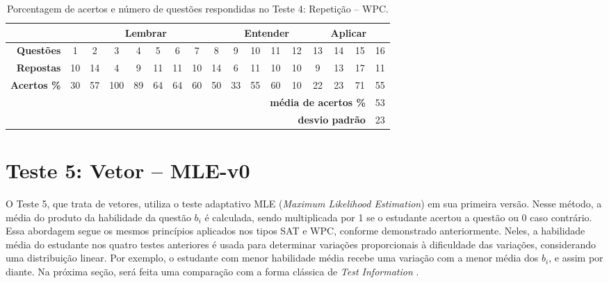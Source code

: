 \begin{table}[!ht]
    \centering
    \caption{Porcentagem de acertos e número de questões respondidas no Teste 4: Repetição -- WPC.}
    \label{tab:respostas_atualizada_teste4}
    \begin{tabular}{|r|*{16}{c|}}
        \hline
        \multicolumn{1}{|l|}{} & \multicolumn{8}{c|}{\cellcolor{green!25}\textbf{Lembrar}} & \multicolumn{4}{c|}{\cellcolor{yellow!25}\textbf{Entender}} & \multicolumn{4}{c|}{\cellcolor{red!25}\textbf{Aplicar}} \\\hline
        \rowcolor[HTML]{D9D9D9} 
        \textbf{Questões}    & 1  & 2 & 3 & 4 & 5 & 6 & 7 & 8 & 9 & 10 & 11 & 12 & 13 & 14 & 15 & 16 \\
        \textbf{Repostas}   & 10 & 14 & 4 & 9 & 11 & 11 & 10 & 14 & 6 & 11 & 10 & 10 & 9 & 13 & 17 & 11 \\
        \rowcolor[HTML]{D9D9D9} 
        \textbf{Acertos \%} & 30 & 57 & 100 & 89 & 64 & 64 & 60 & 50 & 33 & 55 & 60 & 10 & 22 & 23 & 71 & 55 \\ \hline
        \multicolumn{11}{r}{} & \multicolumn{5}{r}{\cellcolor[HTML]{F9CB9C}\textbf{média de acertos \%}} & \multicolumn{1}{c}{\cellcolor[HTML]{F9CB9C}53} \\ 
        \multicolumn{11}{r}{} & \multicolumn{5}{r}{\cellcolor[HTML]{F9CB9C}\textbf{desvio padrão}} & \multicolumn{1}{c}{\cellcolor[HTML]{F9CB9C}23} \\ 
    \end{tabular}
\end{table}

\section{Teste 5: Vetor -- MLE-v0}

O Teste 5, que trata de vetores, utiliza o teste adaptativo MLE (\textit{Maximum Likelihood Estimation}) em sua primeira versão. Nesse método, a média do produto da habilidade da questão \( b_i \) é calculada, sendo multiplicada por 1 se o estudante acertou a questão ou 0 caso contrário. Essa abordagem segue os mesmos princípios aplicados nos tipos SAT e WPC, conforme demonstrado anteriormente. Neles, a habilidade média do estudante nos quatro testes anteriores é usada para determinar variações proporcionais à dificuldade das variações, considerando uma distribuição linear. Por exemplo, o estudante com menor habilidade média recebe uma variação com a menor média dos \( b_i \), e assim por diante. Na próxima seção, será feita uma comparação com a forma clássica de \textit{Test Information} \cite{baker2017basics}.

